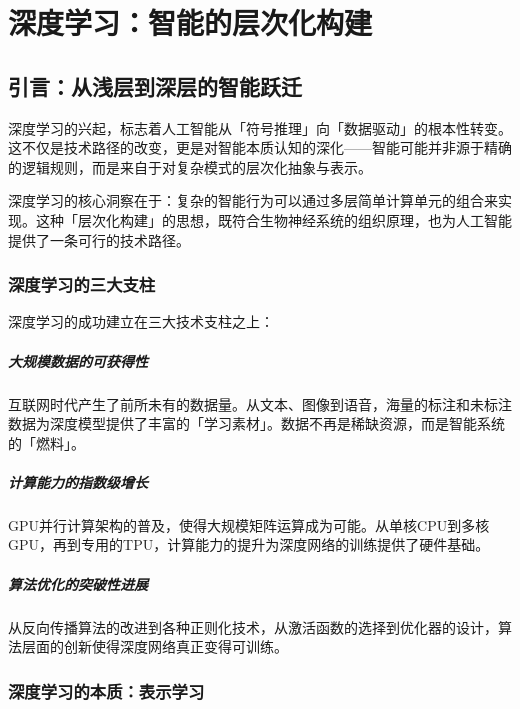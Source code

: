 \chapter{深度学习：智能的层次化构建}

\section{引言：从浅层到深层的智能跃迁}

深度学习的兴起，标志着人工智能从「符号推理」向「数据驱动」的根本性转变。这不仅是技术路径的改变，更是对智能本质认知的深化——智能可能并非源于精确的逻辑规则，而是来自于对复杂模式的层次化抽象与表示。

深度学习的核心洞察在于：复杂的智能行为可以通过多层简单计算单元的组合来实现。这种「层次化构建」的思想，既符合生物神经系统的组织原理，也为人工智能提供了一条可行的技术路径。

\subsection{深度学习的三大支柱}

深度学习的成功建立在三大技术支柱之上：

\paragraph{大规模数据的可获得性}
互联网时代产生了前所未有的数据量。从文本、图像到语音，海量的标注和未标注数据为深度模型提供了丰富的「学习素材」。数据不再是稀缺资源，而是智能系统的「燃料」。

\paragraph{计算能力的指数级增长}
GPU并行计算架构的普及，使得大规模矩阵运算成为可能。从单核CPU到多核GPU，再到专用的TPU，计算能力的提升为深度网络的训练提供了硬件基础。

\paragraph{算法优化的突破性进展}
从反向传播算法的改进到各种正则化技术，从激活函数的选择到优化器的设计，算法层面的创新使得深度网络真正变得可训练。

\subsection{深度学习的本质：表示学习}

